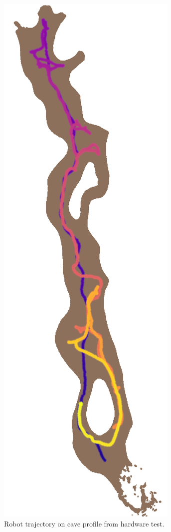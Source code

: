 \documentclass[letterpaper]{article} %
\begin{document}

\begin{figure}
     \centering
  \includegraphics[width=0.45\columnwidth,angle=90, scale=0.7
  ]{figures/darpa_tv_test_figs/cave_path_overlay_lightbrown.png}%
% 
% 
	\caption{Robot trajectory on cave profile from hardware test.}
    \label{fig:lava_tube_traj}
\end{figure}
\end{document}
